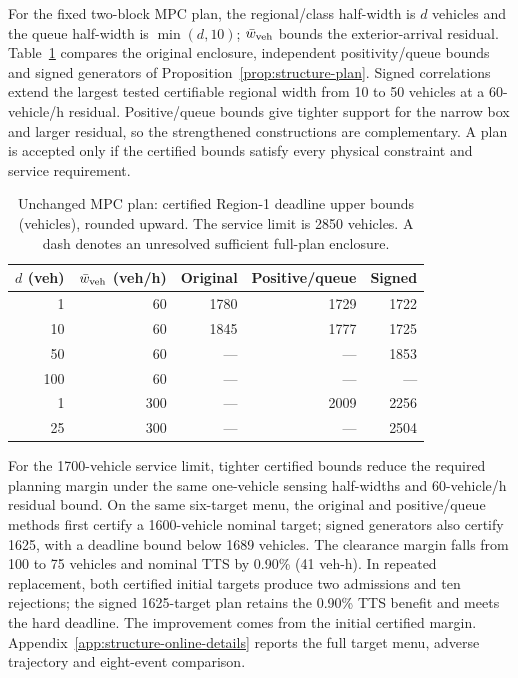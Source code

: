 \documentclass[journal,10pt]{IEEEtran}
\newcommand{\appref}[1]{Appendix~\ref{#1}}
\begin{document}
For the fixed two-block MPC plan, the regional/class half-width is $d$
vehicles and the queue half-width is $\min(d,10)$; $\bar w_{\rm veh}$ bounds the
exterior-arrival residual. Table~\ref{tab:structure-frontier} compares the
original enclosure, independent positivity/queue bounds and signed generators
of Proposition~\ref{prop:structure-plan}. Signed correlations extend the
largest tested certifiable regional width from 10 to 50 vehicles at a
60-vehicle/h residual. Positive/queue bounds give tighter support for the
narrow box and larger residual, so the strengthened constructions are
complementary. A plan is accepted only if the certified bounds satisfy every physical
constraint and service requirement.

\begin{table}[t]
\centering\small
\caption{Unchanged MPC plan: certified Region-1 deadline upper bounds
(vehicles), rounded upward. The service limit is 2850 vehicles. A dash
denotes an unresolved sufficient full-plan enclosure.}
\label{tab:structure-frontier}
\setlength{\tabcolsep}{5pt}
\begin{tabular}{@{}rrrrr@{}}
\toprule
$d$ (veh) & $\bar w_{\rm veh}$ (veh/h) & Original & Positive/queue & Signed\\
\midrule
1 & 60 & 1780 & 1729 & 1722\\
10 & 60 & 1845 & 1777 & 1725\\
50 & 60 & --- & --- & 1853\\
100 & 60 & --- & --- & ---\\
1 & 300 & --- & 2009 & 2256\\
25 & 300 & --- & --- & 2504\\
\bottomrule
\end{tabular}
\end{table}

For the 1700-vehicle service limit, tighter certified bounds reduce the
required planning margin under the same one-vehicle sensing half-widths
and 60-vehicle/h residual bound. On the same six-target menu, the original and
positive/queue methods first certify a 1600-vehicle nominal target; signed
generators also certify 1625, with a deadline bound below 1689 vehicles.
The clearance margin falls from 100 to 75 vehicles and nominal TTS by
0.90\% (41 veh-h). In repeated replacement, both certified initial targets
produce two admissions and ten rejections; the signed 1625-target plan
retains the 0.90\% TTS benefit and meets the hard deadline. The improvement
comes from the initial certified margin. \appref{app:structure-online-details}
reports the full target menu, adverse trajectory and eight-event comparison.
\end{document}
